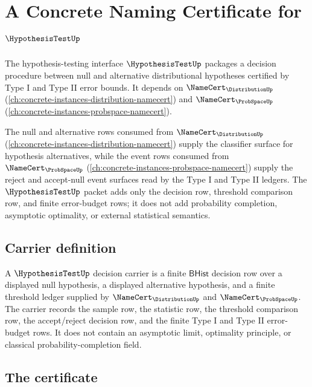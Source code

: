 \chapter{A Concrete Naming Certificate for $\HypothesisTestUp$}
\label{ch:concrete-instances-hypothesis-namecert}

The hypothesis-testing interface $\HypothesisTestUp$ packages a decision procedure between null and alternative distributional hypotheses certified by Type I and Type II error bounds. It depends on $\NameCert_{\DistributionUp}$ (\autoref{ch:concrete-instances-distribution-namecert}) and $\NameCert_{\ProbSpaceUp}$ (\autoref{ch:concrete-instances-probspace-namecert}).

The null and alternative rows consumed from $\NameCert_{\DistributionUp}$ (\autoref{ch:concrete-instances-distribution-namecert}) supply the classifier surface for hypothesis alternatives, while the event rows consumed from $\NameCert_{\ProbSpaceUp}$ (\autoref{ch:concrete-instances-probspace-namecert}) supply the reject and accept-null event surfaces read by the Type I and Type II ledgers. The $\HypothesisTestUp$ packet adds only the decision row, threshold comparison row, and finite error-budget rows; it does not add probability completion, asymptotic optimality, or external statistical semantics.

\section{Carrier definition}
\label{sec:hypothesis-carrier}

\begin{definition}
\label{def:hypothesistest-decision-carrier}
A $\HypothesisTestUp$ decision carrier is a finite $\mathsf{BHist}$ decision
row over a displayed null hypothesis, a displayed alternative hypothesis, and a
finite threshold ledger supplied by $\NameCert_{\DistributionUp}$ and
$\NameCert_{\ProbSpaceUp}$. The carrier records the sample row, the statistic
row, the threshold comparison row, the accept/reject decision row, and the
finite Type I and Type II error-budget rows. It does not contain an asymptotic
limit, optimality principle, or classical probability-completion field.
\end{definition}

\section{The certificate}
\label{sec:hypothesis-certificate}

